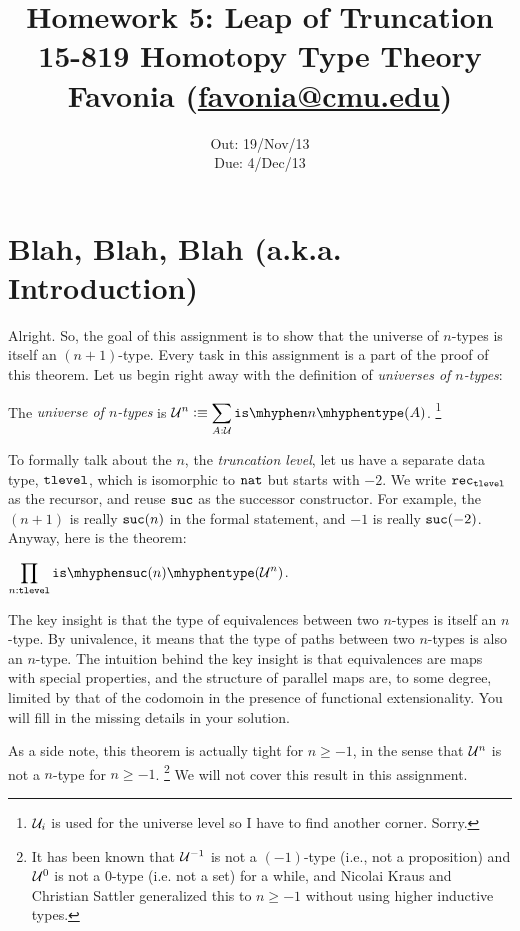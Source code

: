\documentclass[12pt]{article}
\title{\Large\textbf{
  Homework 5: Leap of Truncation}
\normalsize\\
15-819 Homotopy Type Theory\\
Favonia (\href{mailto:favonia@cmu.edu}{favonia@cmu.edu})}
\author{}
\date{%
Out: 19/Nov/13\\
Due: 4/Dec/13
}
\theoremstyle{plain}
\begin{document}
\maketitle

\section{Blah, Blah, Blah (a.k.a. Introduction)}

Alright. So, the goal of this assignment is to show that
the universe of $n$-types is itself an $(n{+}1)$-type.
Every task in this assignment is a part of the proof of this theorem.
Let us begin right away with the definition of \emph{universes of $n$-types}:
\begin{definition}
  The
  \emph{universe of $n$-types}
  is
  $\displaystyle \U^n \defeq \sum_{A:\U} \istype{n}(A)$.%
  \footnote{$\mathcal{U}_i$ is used for the universe level so I have to find another corner. Sorry.}
\end{definition}

To formally talk about the $n$, the \emph{truncation level},
let us have a separate data type, $\mathtt{tlevel}$,
which is isomorphic to $\mathtt{nat}$ but starts with $-2$.
We write $\mathtt{rec}_{\mathtt{tlevel}}$ as the recursor,
and reuse $\mathtt{suc}$ as the successor constructor.
For example, the $(n{+}1)$ is really $\mathtt{suc}(n)$ in the formal statement,
and $-1$ is really $\mathtt{suc}(-2)$.
Anyway, here is the theorem:
\begin{theorem}
  $\displaystyle \prod_{n:\tlevel} \istype{\suc(n)}(\U^n)$.
\end{theorem}

The key insight is that
the type of equivalences between two $n$-types
is itself an $n$-type.
By univalence,
it means that the type of paths between two $n$-types
is also an $n$-type.
The intuition behind the key insight is that
equivalences are maps with special properties,
and the structure of parallel maps are, to some degree,
limited by that of the codomoin in the presence of functional extensionality.
You will fill in the missing details in your solution.

As a side note,
this theorem is actually tight for $n \geq -1$, in the sense that
$\mathcal{U}^n$ is not a $n$-type for $n \geq -1$.%
\footnote{It has been known that $\mathcal{U}^{-1}$ is not a $(-1)$-type (i.e., not a proposition)
  and $\mathcal{U}^0$ is not a $0$-type (i.e. not a set) for a while,
  and Nicolai Kraus and Christian Sattler generalized this to $n\geq -1$
  without using higher inductive types.}
We will not cover this result in this assignment.
\end{document}
